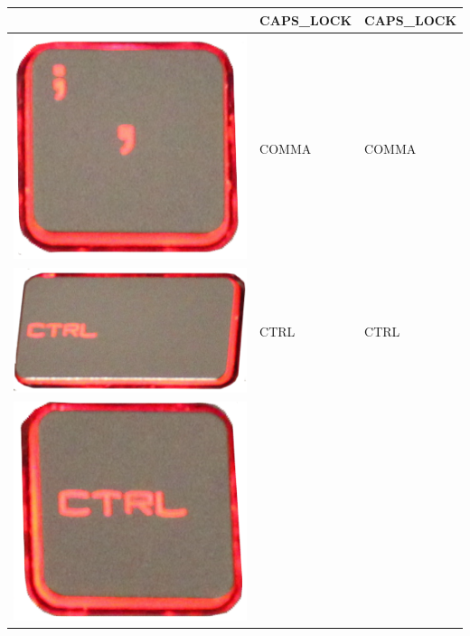 \begin{longtable}{|cll|}
\begin{minipage}[c]{.4\textwidth}
\vspace{0.2cm}
\end{minipage} & CAPS\_LOCK & CAPS\_LOCK\\
\hline
\begin{minipage}[c]{.4\textwidth}
\vspace{0.2cm}
\includegraphics[scale=0.08]{Images/KeyMapping/COMMA}
\vspace{0.2cm}
\end{minipage} & COMMA & COMMA\\
\hline
\begin{minipage}[c]{.4\textwidth}
\vspace{0.2cm}
\includegraphics[scale=0.08]{Images/KeyMapping/CTRL}
\vspace{0.2cm}
\end{minipage} & CTRL & CTRL\\
\hline
\begin{minipage}[c]{.4\textwidth}
\vspace{0.2cm}
\includegraphics[scale=0.08]{Images/KeyMapping/CTRL_R}

\end{minipage}
\end{longtable}
